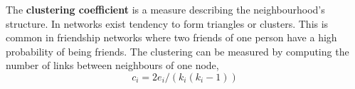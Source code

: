 

The \textbf{clustering coefficient} is a measure describing the neighbourhood's structure. In networks exist tendency to form triangles or clusters. This is common in friendship networks where two friends of one person have a high probability of being friends. The clustering can be measured by computing the number of links between neighbours of one node,
\begin{equation}
c_i=2e_i/(k_i(k_i-1))
\end{equation}

